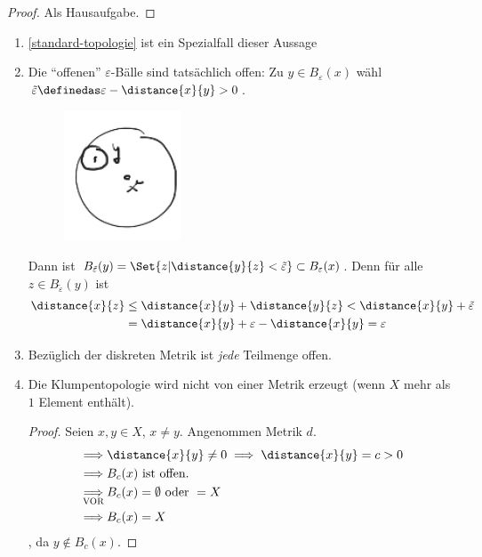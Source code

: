 \begin{proof}
    Als Hausaufgabe.    
\end{proof}
\begin{bemerkungen}
    \begin{enumerate}
        \item \ref{standard-topologie} ist ein Spezialfall dieser Aussage
        \item Die \enquote{offenen} \( \varepsilon \)-Bälle sind tatsächlich offen: Zu \( y\in B_\varepsilon(x) \) wähl \( \tilde{\varepsilon}\definedas \varepsilon-\distance{x}{y}>0 \).
        \begin{figure}[H]
            \centering
            \includegraphics[width=0.3\linewidth]{figures/offene_baelle_sind_offen}
            \label{fig:offene_baelle_sind_offen}
        \end{figure}
        Dann ist \( B_{\tilde{\varepsilon}}(y)=\Set{z|\distance{y}{z}<\tilde{\varepsilon}} \subset B_\varepsilon(x)\). Denn für alle \( z\in B_{\tilde{\varepsilon}}(y) \) ist
        \begin{align*}
            \distance{x}{z}\begin{aligned}[t] 
                &\leq \distance{x}{y}+\distance{y}{z}<\distance{x}{y}+\tilde{\varepsilon}\\
                &=\distance{x}{y}+\varepsilon-\distance{x}{y}=\varepsilon
            \end{aligned}
        \end{align*}
        
        \item Bezüglich der diskreten Metrik ist \emph{jede} Teilmenge offen.
        \item Die Klumpentopologie wird nicht von einer Metrik erzeugt (wenn \( X \) mehr als \( 1 \) Element enthält).
        \begin{proof}
            Seien \( x,y\in X \), \( x\neq y \). Angenommen \texists Metrik \( d \).
            \begin{align*}
                \implies &\distance{x}{y}\neq 0\implies \distance{x}{y}=c>0\\
                \implies &B_c(x)\text{ ist offen.}\\
                \underset{\text{\scshape{VOR}}}{\implies} &B_c(x)=\emptyset \text{ oder } =X\\
                \implies &B_c(x)=X
            \end{align*}
            \contra, da \( y\notin B_c(x) \).
            

\end{proof}
\end{enumerate}
\end{bemerkungen}
